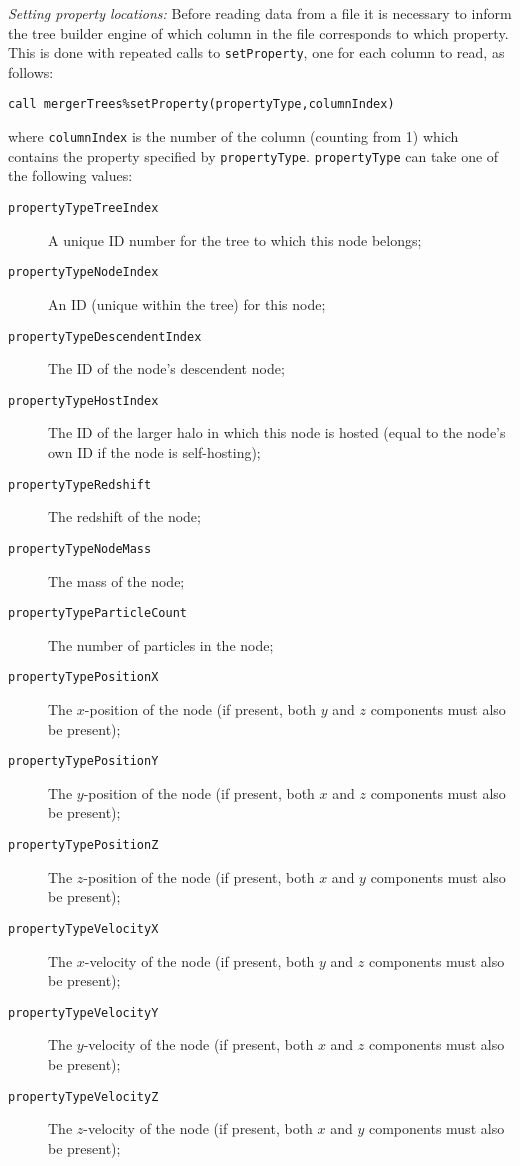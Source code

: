 \noindent \emph{Setting property locations:} Before reading data from a file it is necessary to inform the tree builder engine of which column in the file corresponds to which property. This is done with repeated calls to {\tt setProperty}, one for each column to read, as follows:
\begin{verbatim}
call mergerTrees%setProperty(propertyType,columnIndex)
\end{verbatim}
where {\tt columnIndex} is the number of the column (counting from 1) which contains the property specified by {\tt propertyType}. {\tt propertyType} can take one of the following values:
\begin{description}
 \item [{\tt propertyTypeTreeIndex}] A unique ID number for the tree to which this node belongs;
 \item [{\tt propertyTypeNodeIndex}] An ID (unique within the tree) for this node;
 \item [{\tt propertyTypeDescendentIndex}] The ID of the node's descendent node;
 \item [{\tt propertyTypeHostIndex}] The ID of the larger halo in which this node is hosted (equal to the node's own ID if the node is self-hosting);
 \item [{\tt propertyTypeRedshift}] The redshift of the node;
 \item [{\tt propertyTypeNodeMass}] The mass of the node;
 \item [{\tt propertyTypeParticleCount}] The number of particles in the node;
 \item [{\tt propertyTypePositionX}] The $x$-position of the node (if present, both $y$ and $z$ components must also be present);
 \item [{\tt propertyTypePositionY}] The $y$-position of the node (if present, both $x$ and $z$ components must also be present);
 \item [{\tt propertyTypePositionZ}] The $z$-position of the node (if present, both $x$ and $y$ components must also be present);
 \item [{\tt propertyTypeVelocityX}] The $x$-velocity of the node (if present, both $y$ and $z$ components must also be present);
 \item [{\tt propertyTypeVelocityY}] The $y$-velocity of the node (if present, both $x$ and $z$ components must also be present);
 \item [{\tt propertyTypeVelocityZ}] The $z$-velocity of the node (if present, both $x$ and $y$ components must also be present);

\end{description}
